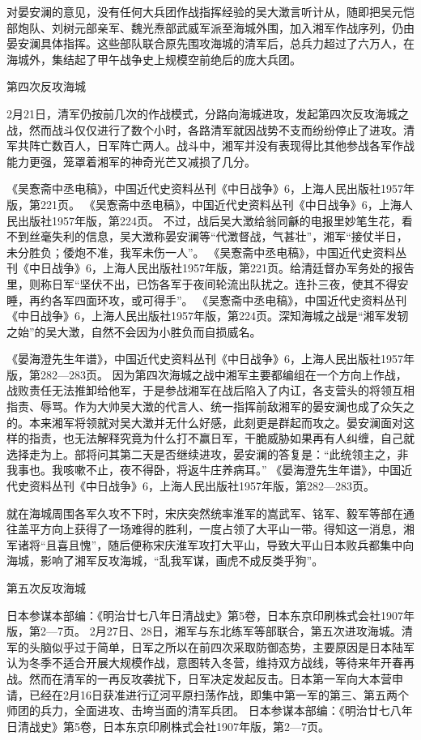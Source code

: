 \documentclass[12pt,UTF8]{ctexbook}
\begin{document}
对晏安澜的意见，没有任何大兵团作战指挥经验的吴大澂言听计从，随即把吴元恺部炮队、刘树元部亲军、魏光焘部武威军派至海城外围，加入湘军作战序列，仍由晏安澜具体指挥。这些部队联合原先围攻海城的清军后，总兵力超过了六万人，在海城外，集结起了甲午战争史上规模空前绝后的庞大兵团。

第四次反攻海城

2月21日，清军仍按前几次的作战模式，分路向海城进攻，发起第四次反攻海城之战，然而战斗仅仅进行了数个小时，各路清军就因战势不支而纷纷停止了进攻。清军共阵亡数百人，日军阵亡两人。战斗中，湘军并没有表现得比其他参战各军作战能力更强，笼罩着湘军的神奇光芒又减损了几分。

《吴愙斋中丞电稿》，中国近代史资料丛刊《中日战争》6，上海人民出版社1957年版，第221页。
《吴愙斋中丞电稿》，中国近代史资料丛刊《中日战争》6，上海人民出版社1957年版，第224页。
不过，战后吴大澂给翁同龢的电报里妙笔生花，看不到丝毫失利的信息，吴大澂称晏安澜等“代澂督战，气甚壮”，湘军“接仗半日，未分胜负；倭炮不准，我军未伤一人”。 《吴愙斋中丞电稿》，中国近代史资料丛刊《中日战争》6，上海人民出版社1957年版，第221页。给清廷督办军务处的报告里，则称日军“坚伏不出，已饬各军于夜间轮流出队扰之。连扑三夜，使其不得安睡，再约各军四面环攻，或可得手”。 《吴愙斋中丞电稿》，中国近代史资料丛刊《中日战争》6，上海人民出版社1957年版，第224页。深知海城之战是“湘军发轫之始”的吴大澂，自然不会因为小胜负而自损威名。

《晏海澄先生年谱》，中国近代史资料丛刊《中日战争》6，上海人民出版社1957年版，第282—283页。
因为第四次海城之战中湘军主要都编组在一个方向上作战，战败责任无法推卸给他军，于是参战湘军在战后陷入了内讧，各支营头的将领互相指责、辱骂。作为大帅吴大澂的代言人、统一指挥前敌湘军的晏安澜也成了众矢之的。本来湘军将领就对吴大澂并无什么好感，此刻更是群起而攻之。晏安澜面对这样的指责，也无法解释究竟为什么打不赢日军，干脆威胁如果再有人纠缠，自己就选择走为上。部将问其第二天是否继续进攻，晏安澜的答复是：“此统领主之，非我事也。我咳嗽不止，夜不得卧，将返牛庄养病耳。” 《晏海澄先生年谱》，中国近代史资料丛刊《中日战争》6，上海人民出版社1957年版，第282—283页。

就在海城周围各军久攻不下时，宋庆突然统率淮军的嵩武军、铭军、毅军等部在通往盖平方向上获得了一场难得的胜利，一度占领了大平山一带。得知这一消息，湘军诸将“且喜且愧”，随后便称宋庆淮军攻打大平山，导致大平山日本败兵都集中向海城，影响了湘军反攻海城，“乱我军谋，画虎不成反类乎狗”。

第五次反攻海城

日本参谋本部编：《明治廿七八年日清战史》第5卷，日本东京印刷株式会社1907年版，第2—7页。
2月27日、28日，湘军与东北练军等部联合，第五次进攻海城。清军的头脑似乎过于简单，日军之所以在前四次采取防御态势，主要原因是日本陆军认为冬季不适合开展大规模作战，意图转入冬营，维持双方战线，等待来年开春再战。然而在清军的一再反攻袭扰下，日军决定发起反击。日本第一军向大本营申请，已经在2月16日获准进行辽河平原扫荡作战，即集中第一军的第三、第五两个师团的兵力，全面进攻、击垮当面的清军兵团。 日本参谋本部编：《明治廿七八年日清战史》第5卷，日本东京印刷株式会社1907年版，第2—7页。
\end{document}
